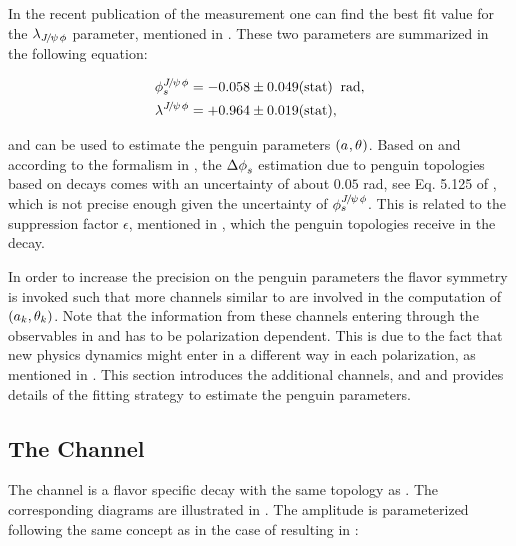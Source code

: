 In the recent \lhcb publication \cite{phis-3fb-paper} of the \phis measurement one can find the best fit value for the $\lambda_{{J\mskip -3mu/\mskip -2mu\psi\mskip 2mu}\phi}$
parameter, mentioned in . These two parameters are summarized in the following equation:


\begin{subequations}
  \label{phis_lambda_result}
  \begin{align}
    \centering
    \phis^{\jpsi\Pphi}     &=  -0.058 \pm 0.049(\text{stat})  \;\; \text{rad},\\
    \lambda^{\jpsi\Pphi}   &=  +0.964 \pm 0.019(\text{stat}),
  \end{align}
\end{subequations}

\noindent and can be used to estimate the penguin parameters $(a_{},\theta_{})$.
Based on  and according to the formalism in , the $\Delta\phi_{s}^{}$ estimation
due to penguin topologies based on \BsJpsiPhi decays comes with an uncertainty of about $0.05$ rad, see Eq. 5.125 of \cite{DeBruyn-thesis},
which is not precise enough given the uncertainty of $\phi_{s}^{{J\mskip -3mu/\mskip -2mu\psi\mskip 2mu}\phi}$. This is related to the suppression factor $\epsilon$,
mentioned in , which the penguin topologies receive in the \BsJpsiPhi decay.

In order to increase the precision on the penguin parameters the \grpsuthree flavor symmetry is
invoked such that more channels similar to \BsJpsiPhi are involved in the computation of $(a_k,\theta_k)$.
Note that the information from these channels entering through the observables in  and 
has to be polarization dependent. This is due to the fact that new physics dynamics might enter in a different way in each polarization,
as mentioned in \cite{DeBruyn-thesis}.
This section introduces the additional channels, \BsJpsiKst and \BdJpsiRho and provides
details of the fitting strategy to estimate the penguin parameters.

\subsection{The \BsJpsiKst Channel}
\label{bsjpsikst_chanell}

The \BsJpsiKst channel is a flavor specific decay with the same topology as \BsJpsiPhi.
The corresponding diagrams are illustrated in .
The \BsJpsiKst amplitude is parameterized following the same concept as in the case of \BsJpsiPhi resulting in \cite{DeBruyn:2014oga}:

